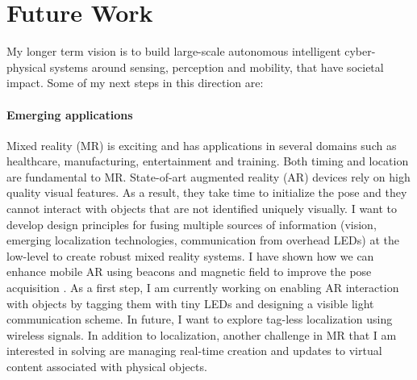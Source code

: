 \documentclass[10pt]{article}
\begin{document}



\section{Future Work}
My longer term vision is to build large-scale autonomous intelligent cyber-physical systems around sensing, perception and mobility, that have societal impact. Some of my next steps in this direction are: %


\paragraph{Emerging applications}
Mixed reality (MR) is exciting and has applications in several domains such as healthcare, manufacturing, entertainment and training.
Both timing and location are fundamental to MR. State-of-art augmented reality (AR) devices rely on high quality visual features. As a result, they take time to initialize the pose and they cannot interact with objects that 
are not identified uniquely visually.  %
I want to develop design principles for fusing multiple sources of information (vision, emerging localization technologies, communication from overhead LEDs) at the low-level to create robust mixed reality systems. %
I have shown how we can enhance mobile AR using beacons and magnetic field to improve the pose acquisition \cite{mobileAR}. As a first step, I am currently working on enabling AR interaction with objects by tagging them with tiny LEDs and designing a visible light communication scheme. In future, I want to explore tag-less localization using wireless signals. 
In addition to localization, another challenge in MR that I am interested in solving are managing real-time creation and updates to virtual content associated with physical
objects. %
\end{document}
